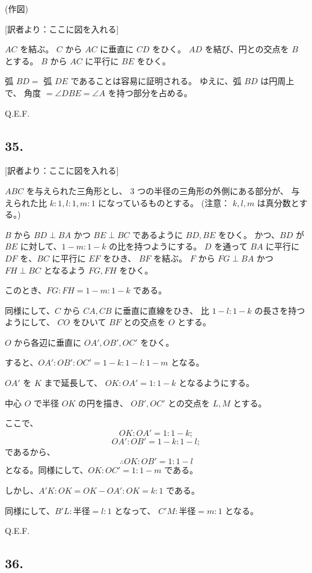 (作図)

[訳者より：ここに図を入れる] 

$AC$ を結ぶ。
$C$ から $AC$ に垂直に $CD$ をひく。
$AD$ を結び、円との交点を $B$ とする。
$B$ から $AC$ に平行に $BE$ をひく。

弧 $BD = $ 弧 $DE$ であることは容易に証明される。
ゆえに、弧 $BD$ は円周上で、
角度 $= \angle DBE = \angle A$ を持つ部分を占める。

Q.E.F.

\subsection*{35.}

[訳者より：ここに図を入れる] 

$ABC$ を与えられた三角形とし、
 3 つの半径の三角形の外側にある部分が、
与えられた比 $k: 1, l: 1, m: 1$ になっているものとする。
(注意： $k, l, m$ は真分数とする。)

$B$ から $BD \perp BA$ かつ $BE \perp BC$
であるように $BD, BE$ をひく。
かつ、$BD$ が $BE$ に対して、$1-m: 1-k$ の比を持つようにする。
$D$ を通って $BA$ に平行に $DF$ を、$BC$ に平行に $EF$ をひき、
$BF$ を結ぶ。
$F$ から $FG \perp BA$ かつ $FH \perp BC$ となるよう $FG, FH$ をひく。

このとき、$FG: FH = 1-m: 1-k$ である。

同様にして、$C$ から $CA, CB$ に垂直に直線をひき、
比 $1-l: 1-k$ の長さを持つようにして、
$CO$ をひいて $BF$ との交点を $O$ とする。

$O$ から各辺に垂直に $OA', OB', OC'$ をひく。

すると、$OA': OB': OC' = 1-k: 1-l: 1-m$ となる。

$OA'$ を $K$ まで延長して、
$OK: OA' = 1: 1-k$ となるようにする。

中心 $O$ で半径 $OK$ の円を描き、
$OB', OC'$ との交点を $L, M$ とする。

ここで、
\[
OK: OA' = 1: 1-k;
\]
\[
OA': OB' = 1-k: 1-l;
\]
であるから、
\[
\therefore
OK: OB' = 1: 1-l
\]
となる。同様にして、$OK: OC' = 1: 1-m$ である。

しかし、$A'K: OK = OK - OA': OK = k: 1$  である。

同様にして、$B'L: \mbox{半径} = l: 1$ となって、
$C'M: \mbox{半径} = m: 1$ となる。

Q.E.F.

\subsection*{36.}

